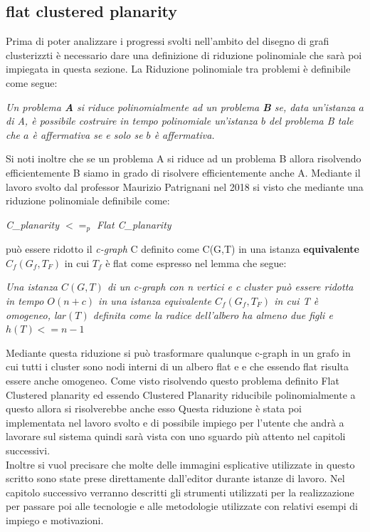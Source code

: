 \subsection{flat clustered planarity}
Prima di poter analizzare i progressi svolti nell'ambito del disegno di grafi clusterizzti è necessario dare una definizione di riduzione polinomiale che sarà poi impiegata in questa sezione.
La Riduzione polinomiale tra problemi è definibile come segue:
\begin{center}
	\textit{Un problema \textbf{A} si riduce polinomialmente ad un problema \textbf{B} se, data un’istanza $a$ di A, è possibile costruire in tempo polinomiale un’istanza $b$ del problema B tale che $a$ è affermativa se e solo se $b$ è affermativa.}
\end{center}
Si noti inoltre che se un problema A si riduce ad un problema B allora risolvendo efficientemente B siamo in grado di risolvere efficientemente anche A. 
Mediante il lavoro svolto dal professor Maurizio Patrignani nel 2018 si visto che mediante una riduzione polinomiale definibile come:
\begin{center}
\textit{C\_planarity $<=_p$ Flat C\_planarity}
\end{center} 
può essere ridotto il \textit{c-graph} C definito come C(G,T) in una istanza \textbf{equivalente} $C_f(G_f,T_F)$ in cui $T_f$ è flat come espresso nel lemma che segue:
\begin{center}
\textit{Una istanza $C(G,T)$ di un c-graph con n vertici e c cluster può essere ridotta in tempo $O(n+c)$ in una istanza equivalente $C_f(G_f,T_F)$ in cui T è omogeneo, la$r(T)$ definita come la radice dell'albero ha almeno due figli e $h(T)<=n-1$}
\end{center}
Mediante questa riduzione si può trasformare qualunque c-graph in un grafo in cui tutti i cluster sono nodi interni di un albero flat e e che essendo flat risulta essere anche omogeneo. Come visto risolvendo questo problema definito Flat Clustered planarity ed essendo Clustered Planarity riducibile polinomialmente a questo allora si risolverebbe anche esso  Questa riduzione è stata poi implementata nel lavoro svolto e di possibile impiego per l'utente che andrà a lavorare sul sistema quindi sarà vista con uno sguardo più attento nel capitoli successivi. \\
Inoltre si vuol precisare che molte delle immagini esplicative utilizzate in questo scritto sono state prese direttamente dall'editor durante istanze di lavoro.
Nel capitolo successivo verranno descritti gli strumenti utilizzati per la realizzazione per passare poi alle tecnologie e alle metodologie utilizzate con relativi esempi di impiego e motivazioni.


